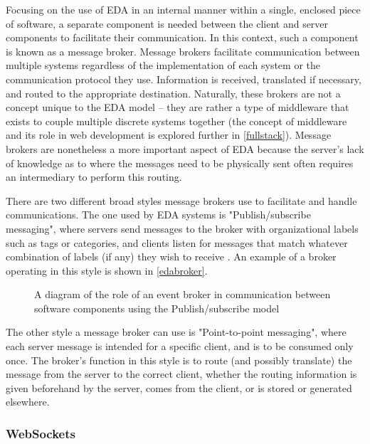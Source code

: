 Focusing on the use of EDA in an internal manner within a single, enclosed piece of software, a separate component is needed between the client and server components to facilitate their communication. In this context, such a component is known as a message broker. Message brokers facilitate communication between multiple systems regardless of the implementation of each system or the communication protocol they use. Information is received, translated if necessary, and routed to the appropriate destination. Naturally, these brokers are not a concept unique to the EDA model -- they are rather a type of middleware that exists to couple multiple discrete systems together (the concept of middleware and its role in web development is explored further in \autoref{fullstack}). Message brokers are nonetheless a more important aspect of EDA because the server's lack of knowledge as to where the messages need to be physically sent often requires an intermediary to perform this routing.

There are two different broad styles message brokers use to facilitate and handle communications. The one used by EDA systems is "Publish/subscribe messaging", where servers send messages to the broker with organizational labels such as tags or categories, and clients listen for messages that match whatever combination of labels (if any) they wish to receive \cite{ibm_what_2021}. An example of a broker operating in this style is shown in \autoref{edabroker}.

\begin{figure}[!ht]
	\begin{center}
		\caption{A diagram of the role of an event broker in communication between software components using the Publish/subscribe model}\label{edabroker}
	\end{center}
\end{figure}

The other style a message broker can use is "Point-to-point messaging", where each server message is intended for a specific client, and is to be consumed only once. The broker's function in this style is to route (and possibly translate) the message from the server to the correct client, whether the routing information is given beforehand by the server, comes from the client, or is stored or generated elsewhere.

\subsubsection{WebSockets}

